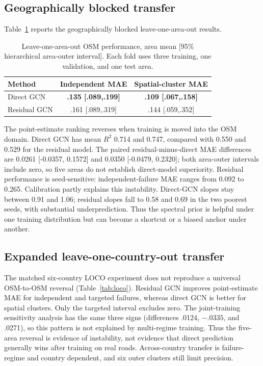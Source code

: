 \documentclass[11pt]{article}
\begin{document}
\subsection{Geographically blocked transfer}
Table~\ref{tab:loao} reports the geographically blocked leave-one-area-out
results.
\begin{table}[H]
\centering
\caption{Leave-one-area-out OSM performance, area mean [95\% hierarchical
area-outer interval]. Each fold uses three training, one validation, and one test area.}
\label{tab:loao}
\begin{tabular}{lcc}
\toprule Method&Independent MAE&Spatial-cluster MAE\\ \midrule
Direct GCN&\textbf{.135 [.089,.199]}&\textbf{.109 [.067,.158]}\\
Residual GCN&.161 [.089,.319]&.144 [.059,.352]\\ \bottomrule
\end{tabular}
\end{table}

The point-estimate ranking reverses when training is moved into the OSM domain. Direct GCN has
mean $R^2$ 0.714 and 0.747, compared with 0.550 and 0.529 for the residual
model. The paired residual-minus-direct MAE differences are 0.0261
[-0.0357, 0.1572] and 0.0350 [-0.0479, 0.2320]; both area-outer intervals include zero,
so five areas do not establish direct-model superiority. Residual performance is seed-sensitive: independent-failure MAE ranges
from 0.092 to 0.265. Calibration partly explains this instability. Direct-GCN
slopes stay between 0.91 and 1.06; residual slopes fall to 0.58 and 0.69 in the
two poorest seeds, with substantial underprediction. Thus the spectral prior is
helpful under one training distribution but can become a shortcut or a biased
anchor under another.

\subsection{Expanded leave-one-country-out transfer}
The matched six-country LOCO experiment does not reproduce a universal
OSM-to-OSM reversal (Table~\ref{tab:loco}). Residual GCN improves point-estimate
MAE for independent and targeted failures, whereas direct GCN is better for
spatial clusters. Only the targeted interval excludes zero. The joint-training
sensitivity analysis has the same three signs (differences .0124, $-.0335$,
and .0271), so this pattern is not explained by multi-regime training. Thus the
five-area reversal is evidence of instability, not evidence that direct
prediction generally wins after training on real roads. Across-country transfer
is failure-regime and country dependent, and six outer clusters still limit
precision.
\end{document}
